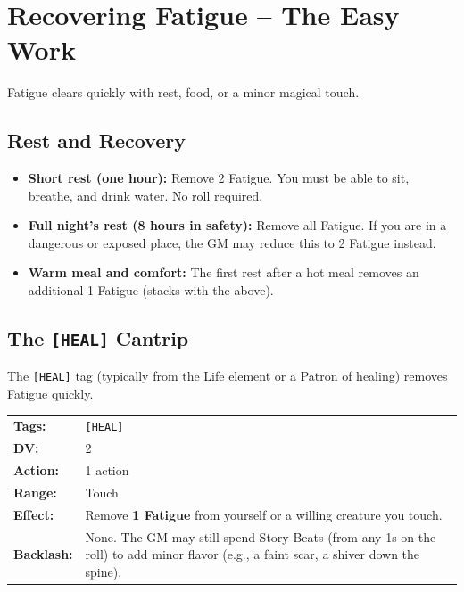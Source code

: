 \section{Recovering Fatigue -- The Easy Work}
\label{sec:recovering-fatigue}

Fatigue clears quickly with rest, food, or a minor magical touch.

\subsection{Rest and Recovery}
\label{subsec:rest-fatigue}

\begin{itemize}
  \item \textbf{Short rest (one hour):} Remove 2 Fatigue. You must be able to sit, breathe, and drink water. No roll required.
  \item \textbf{Full night's rest (8 hours in safety):} Remove all Fatigue. If you are in a dangerous or exposed place, the GM may reduce this to 2 Fatigue instead.
  \item \textbf{Warm meal and comfort:} The first rest after a hot meal removes an additional 1 Fatigue (stacks with the above).
\end{itemize}

\subsection{The \texttt{[HEAL]} Cantrip}
\label{subsec:HEAL-cantrip}

The \texttt{[HEAL]} tag (typically from the Life element or a Patron of healing) removes Fatigue quickly.

\begin{tcolorbox}[colback=green!5!white,colframe=green!75!black, title=\texttt{[HEAL]} Cantrip]
\begin{tabular}{ll}
\textbf{Tags:} & \texttt{[HEAL]} \\
\textbf{DV:} & 2 \\
\textbf{Action:} & 1 action \\
\textbf{Range:} & Touch \\
\textbf{Effect:} & Remove \textbf{1 Fatigue} from yourself or a willing creature you touch. \\
\textbf{Backlash:} & None. The GM may still spend Story Beats (from any 1s on the roll) to add minor flavor (e.g., a faint scar, a shiver down the spine).
\end{tabular}
\end{tcolorbox}


